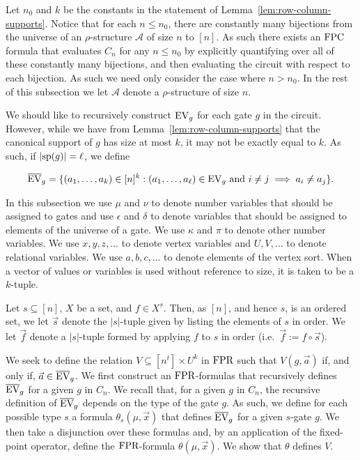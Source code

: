 \documentclass[../paper.tex]{subfiles}
\begin{document}
Let $n_0$ and $k$ be the constants in the statement of
Lemma~\ref{lem:row-column-supports}. Notice that for each $n \leq n_0$, there
are constantly many bijections from the universe of an $\rho$-structure
$\mathcal{A}$ of size $n$ to $[n]$. As such there exists an $\text{\upshape FPC}$ formula that
evaluates $C_n$ for any $n \leq n_0$ by explicitly quantifying over all of these
constantly many bijections, and then evaluating the circuit with respect to each
bijection. As such we need only consider the case where $n > n_0$. In the rest
of this subsection we let $\mathcal{A}$ denote a $\rho$-structure of size $n$.

We should like to recursively construct $\text{EV}_g$ for each gate $g$ in the
circuit. However, while we have from Lemma~\ref{lem:row-column-supports} that
the canonical support of $g$ has size at most $k$, it may not be exactly equal
to $k$. As such, if $\vert \text{sp}(g) \vert = \ell$, we define

\begin{align*}
	\overline{\text{EV}}_g = \{ (a_1, \ldots , a_k) \in [n]^k : (a_1 , \ldots , a_\ell ) \in \text{EV}_g \text{ and } i \neq j \implies a_i \neq a_j \}. 
\end{align*}

In this subsection we use $\mu$ and $\nu$ to denote number variables that should
be assigned to gates and use $\epsilon$ and $\delta$ to denote variables that
should be assigned to elements of the universe of a gate. We use $\kappa$ and
$\pi$ to denote other number variables. We use $x, y, z, \ldots$ to denote
vertex variables and $U, V, \ldots$ to denote relational variables. We use $a,
b, c , \ldots$ to denote elements of the vertex sort. When a vector of values or
variables is used without reference to size, it is taken to be a $k$-tuple.

Let $s \subseteq [n]$, $X$ be a set, and $f \in X^{\underline{s}}$. Then, as
$[n]$, and hence $s$, is an ordered set, we let $\vec{s}$ denote the $\vert s
\vert$-tuple given by listing the elements of $s$ in order. We let $\vec{f}$
denote a $\vert s \vert$-tuple formed by applying $f$ to $s$ in order (i.e.\
$\vec{f} := f \circ \vec{s}$).

We seek to define the relation $V \subseteq [n^t] \times U^k$ in $\text{\upshape FPR}$ such
that $V(g, \vec{a})$ if, and only if, $\vec{a} \in \overline {\text{EV}}_g$. We first
construct an $\text{\upshape FPR}$-formulas that recursively defines $\overline{\text{EV}}_g$ for a
given $g$ in $C_n$. We recall that, for a given $g$ in $C_n$, the recursive
definition of $\overline{\text{EV}}_g$ depends on the type of the gate $g$. As such,
we define for each possible type $s$ a formula $\theta_s(\mu, \vec{x})$ that
defines $\overline{\text{EV}}_g$ for a given $s$-gate $g$. We then take a disjunction
over these formulas and, by an application of the fixed-point operator, define
the $\text{\upshape FPR}$-formula $\theta(\mu, \vec{x})$. We show that $\theta$ defines $V$.
\end{document}
